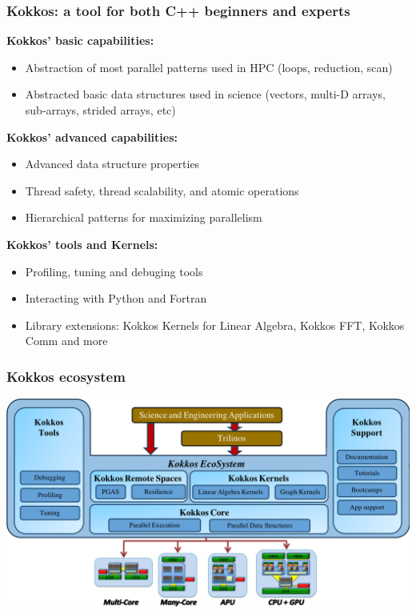 \documentclass[aspectratio=169]{beamer}
\begin{document}
\begin{frame}
    \frametitle{Kokkos: a tool for both C++ beginners and experts} 
    \textbf{Kokkos' basic capabilities:}
    \begin{itemize}
        \item Abstraction of most parallel patterns used in HPC (loops, reduction, scan)
        \item Abstracted basic data structures used in science (vectors, multi-D arrays, sub-arrays, strided arrays, etc)
    \end{itemize}
    \textbf{Kokkos' advanced capabilities:}
    \begin{itemize}
        \item Advanced data structure properties
        \item Thread safety, thread scalability, and atomic operations
        \item Hierarchical patterns for maximizing parallelism 
    \end{itemize}
    \textbf{Kokkos' tools and Kernels:}
    \begin{itemize}
        \item Profiling, tuning and debuging tools
        \item Interacting with Python and Fortran
        \item Library extensions: Kokkos Kernels for Linear Algebra, Kokkos FFT, Kokkos Comm and more 
    \end{itemize}
\end{frame}


\begin{frame}
    \frametitle{Kokkos ecosystem}

    \begin{center}
        \includegraphics[width=\textwidth]{../../images/kokkos-ecosystem.png}
    \end{center}

\end{frame}
\end{document}

